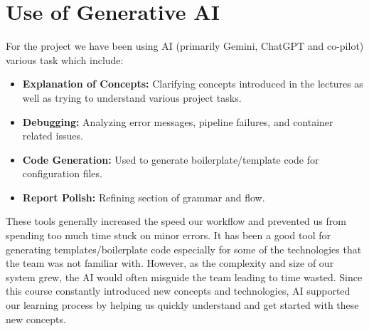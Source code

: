 \section{Use of Generative AI}
\noindent For the project we have been using AI (primarily Gemini, ChatGPT and co-pilot) various task which include:
\begin{itemize}
  \item \textbf{Explanation of Concepts:} Clarifying concepts introduced in the lectures as well as trying to understand various project tasks.
    \item \textbf{Debugging:} Analyzing error messages, pipeline failures, and container related issues.
    \item \textbf{Code Generation:} Used to generate boilerplate/template code for configuration files.
    \item \textbf{Report Polish:} Refining section of grammar and flow.
\end{itemize}
These tools generally increased the speed our workflow and prevented us from spending too much time stuck on minor errors. It has been a good tool for generating templates/boilerplate code especially for some of the technologies that the team was not familiar with. However, as the complexity and size of our system grew, the AI would often misguide the team leading to time wasted. Since this course constantly introduced new concepts and technologies, AI supported our learning process by helping us quickly understand and get started with these new concepts.
